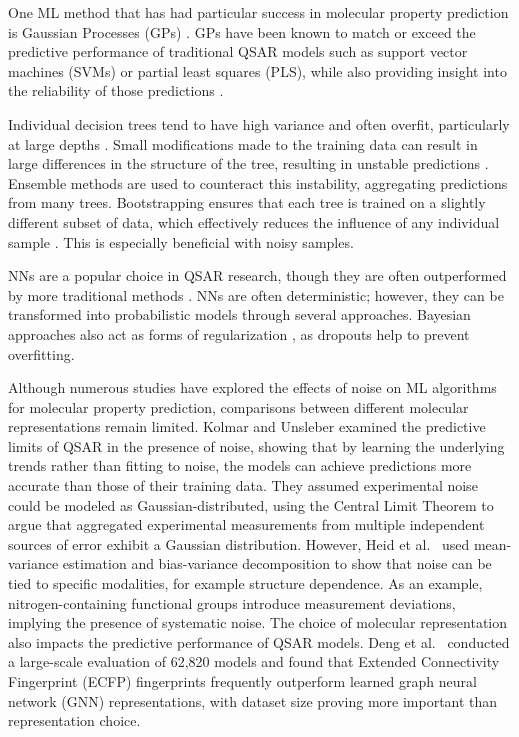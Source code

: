\documentclass[pdflatex,sn-mathphys-num]{sn-jnl}%
\theoremstyle{thmstyleone}%
\theoremstyle{thmstyletwo}%
\theoremstyle{thmstylethree}%
\begin{document}
One ML method that has had particular success in molecular property prediction is Gaussian Processes (GPs) \citep{Obrezanova2007, gauche}. GPs have been known to match or exceed the predictive performance of traditional QSAR models such as support vector machines (SVMs) or partial least squares (PLS), while also providing insight into the reliability of those predictions \citep{Obrezanova2007}.

Individual decision trees tend to have high variance and often overfit, particularly at large depths \citep{Breiman1984}. Small modifications made to the training data can result in large differences in the structure of the tree, resulting in unstable predictions \citep{Breiman2001}. Ensemble methods are used to counteract this instability, aggregating predictions from many trees. Bootstrapping ensures that each tree is trained on a slightly different subset of data, which effectively reduces the influence of any individual sample \citep{Breiman2001}. This is especially beneficial with noisy samples.

NNs are a popular choice in QSAR research, though they are often outperformed by more traditional methods \citep{Baskin2008, Koutsoukas2017}. NNs are often deterministic; however, they can be transformed into probabilistic models through several approaches. Bayesian approaches also act as forms of regularization \citep{Burden2009}, as dropouts help to prevent overfitting.

Although numerous studies have explored the effects of noise on ML algorithms for molecular property prediction, comparisons between different molecular representations remain limited. Kolmar and Unsleber \cite{Kolmar2021} examined the predictive limits of QSAR in the presence of noise, showing that by learning the underlying trends rather than fitting to noise, the models can achieve predictions more accurate than those of their training data. They assumed experimental noise could be modeled as Gaussian-distributed, using the Central Limit Theorem to argue that aggregated experimental measurements from multiple independent sources of error exhibit a Gaussian distribution. However, Heid et al.\ \cite{Heid2023} used mean-variance estimation and bias-variance decomposition to show that noise can be tied to specific modalities, for example structure dependence. As an example, nitrogen-containing functional groups introduce measurement deviations, implying the presence of systematic noise. The choice of molecular representation also impacts the predictive performance of QSAR models. Deng et al.\ \cite{Deng2023} conducted a large-scale evaluation of 62,820 models and found that Extended Connectivity Fingerprint (ECFP) fingerprints frequently outperform learned graph neural network (GNN) representations, with dataset size proving more important than representation choice.
\end{document}
